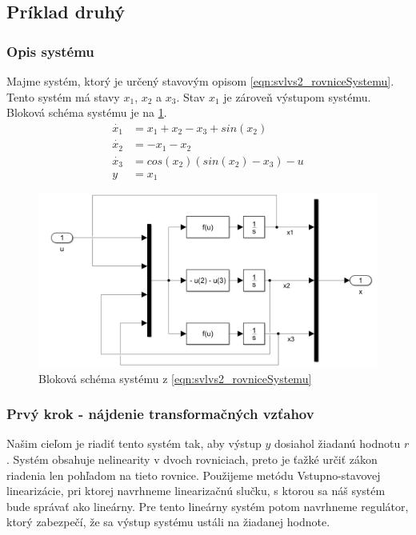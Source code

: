\documentclass[../main.tex]{subfiles}
\begin{document}
	\subsection{Príklad druhý}
    \subsubsection{Opis systému}
	Majme systém, ktorý je určený stavovým opisom \cref{eqn:svlvs2_rovniceSystemu}. Tento systém má stavy $x_1$, $x_2$ a $x_3$. Stav $x_1$ je zároveň výstupom systému. Bloková schéma systému je na \cref{fig:svlvs2_obrazokModelSystemu}.
	\begin{equation}
		\begin{aligned}
		\dot{x_1} &= x_1 + x_2 - x_3 + sin(x_2) 			\\
		\dot{x_2} &= - x_1 - x_2 						\\
		\dot{x_3} &= cos(x_2) (sin(x_2) - x_3) - u 	\\
		y &= x_1
		\end{aligned}
		\label{eqn:svlvs2_rovniceSystemu}
	\end{equation}

	\begin{figure}[h!]
		\centering
		\includegraphics[width=0.8\linewidth]{ModelSystemu}
		\caption{Bloková schéma systému z \cref{eqn:svlvs2_rovniceSystemu}}
		\label{fig:svlvs2_obrazokModelSystemu}
	\end{figure}


    \subsubsection{Prvý krok - nájdenie transformačných vzťahov}
	Našim cieľom je riadiť tento systém tak, aby výstup $y$ dosiahol žiadanú hodnotu $r$. Systém obsahuje nelinearity v dvoch rovniciach, preto je ťažké určiť zákon riadenia len pohľadom na tieto rovnice. Použijeme metódu Vstupno-stavovej linearizácie, pri ktorej navrhneme linearizačnú slučku, s ktorou sa náš systém bude správať ako lineárny. Pre tento lineárny systém potom navrhneme regulátor, ktorý zabezpečí, že sa výstup systému ustáli na žiadanej hodnote.
\end{document}
